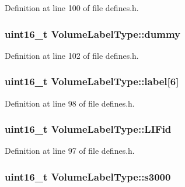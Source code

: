 Definition at line 100 of file defines.\+h.

\subsubsection[{\texorpdfstring{dummy}{dummy}}]{\setlength{\rightskip}{0pt plus 5cm}uint16\+\_\+t Volume\+Label\+Type\+::dummy}\hypertarget{structVolumeLabelType_affbd520c08374524f13708acc05f3f4e}{}\label{structVolumeLabelType_affbd520c08374524f13708acc05f3f4e}


Definition at line 102 of file defines.\+h.

\subsubsection[{\texorpdfstring{label}{label}}]{\setlength{\rightskip}{0pt plus 5cm}uint16\+\_\+t Volume\+Label\+Type\+::label\mbox{[}6\mbox{]}}\hypertarget{structVolumeLabelType_a265fc834b203868cc48482a8be64f60c}{}\label{structVolumeLabelType_a265fc834b203868cc48482a8be64f60c}


Definition at line 98 of file defines.\+h.

\subsubsection[{\texorpdfstring{L\+I\+Fid}{LIFid}}]{\setlength{\rightskip}{0pt plus 5cm}uint16\+\_\+t Volume\+Label\+Type\+::\+L\+I\+Fid}\hypertarget{structVolumeLabelType_a16bdde2d19114ac3238477c29fe75b4a}{}\label{structVolumeLabelType_a16bdde2d19114ac3238477c29fe75b4a}


Definition at line 97 of file defines.\+h.

\subsubsection[{\texorpdfstring{s3000}{s3000}}]{\setlength{\rightskip}{0pt plus 5cm}uint16\+\_\+t Volume\+Label\+Type\+::s3000}\hypertarget{structVolumeLabelType_ac7659e37fbb2bcb0b66c0a0172f9b16c}{}\label{structVolumeLabelType_ac7659e37fbb2bcb0b66c0a0172f9b16c}


